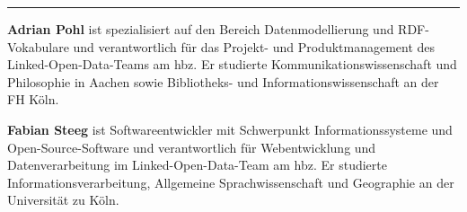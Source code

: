 \begin{center}\rule{0.5\linewidth}{\linethickness}\end{center}

\textbf{Adrian Pohl} ist spezialisiert auf den Bereich Datenmodellierung
und RDF-Vokabulare und verantwortlich für das Projekt- und
Produktmanagement des Linked-Open-Data-Teams am hbz. Er studierte
Kommunikationswissenschaft und Philosophie in Aachen sowie Bibliotheks-
und Informationswissenschaft an der FH Köln.

\textbf{Fabian Steeg} ist Softwareentwickler mit Schwerpunkt
Informationssysteme und Open-Source-Software und verantwortlich für
Webentwicklung und Datenverarbeitung im Linked-Open-Data-Team am hbz. Er
studierte Informationsverarbeitung, Allgemeine Sprachwissenschaft und
Geographie an der Universität zu Köln.
